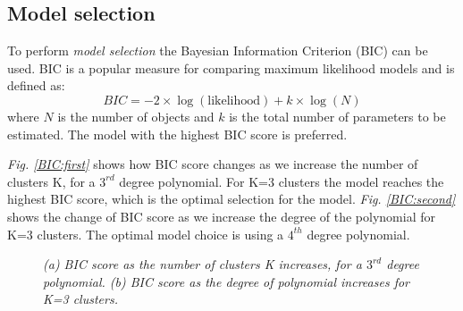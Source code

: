 \subsection{Model selection} \label{meth-synth-model-subsect}
To perform \emph{model selection} the Bayesian Information Criterion (BIC) \citep{Schwarz1978} can be used. BIC is a popular measure for comparing maximum likelihood models and is defined as:
\begin{equation}
	BIC = -2 \times \log (\text{likelihood}) + k \times \log (N)
\end{equation}
where $N$ is the number of objects and $k$ is the total number of parameters to be estimated. The model with the highest BIC score is preferred.

\emph{Fig. \ref{BIC:first}} shows how BIC score changes as we increase the number of clusters K, for a $3^{rd}$ degree polynomial. For K=3 clusters the model reaches the highest BIC score, which is the optimal selection for the model. \emph{Fig. \ref{BIC:second}} shows the change of BIC score as we increase the degree of the polynomial for K=3 clusters. The optimal model choice is using a $4^{th}$ degree polynomial.
\begin{figure}[ht!]
     \begin{center}
    \end{center}
    \caption{\emph{(a) BIC score as the number of clusters K increases, for a $3^{rd}$ degree polynomial. (b) BIC score as the degree of polynomial increases for K=3 clusters.}}
   \label{BIC-pic}
\end{figure}